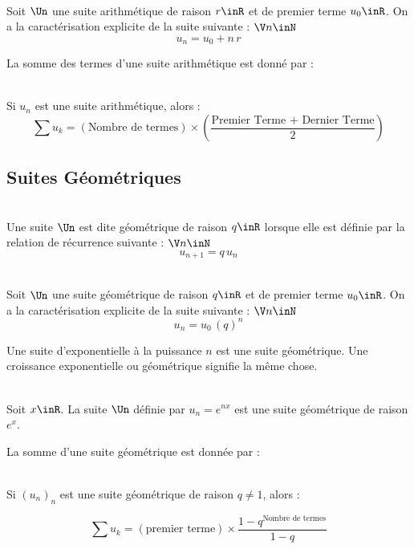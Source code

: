 \documentclass[12pt,fleqn]{report} %
\begin{document}
\begin{proposition}\text{ }\\
	Soit $\Un$ une suite arithmétique de raison $r \inR$ et de premier terme $u_0 \inR$. On a la caractérisation explicite de la suite suivante : $\V n \inN$
	\[
	u_n = u_0 + n\,r
	\]
\end{proposition}

La somme des termes d'une suite arithmétique est donné par :
\begin{proposition}\text{ }\\
	Si $u_n$ est une suite arithmétique, alors : 
	\[
	\sum u_k = (\text{Nombre de termes}) \times \left(\frac{\text{Premier Terme + Dernier Terme}}{2}\right) 
	\]
\end{proposition}



\subsection{Suites Géométriques}
\begin{definition}\text{ }\\
	Une suite $\Un$ est dite géométrique de raison $q \inR$ lorsque elle est définie par la relation de récurrence suivante : $\V n \inN$
	\[
	u_{n+1} = q \,u_n
	\]
\end{definition}

\begin{proposition}\text{ }\\
	Soit $\Un$ une suite géométrique de raison $q \inR$ et de premier terme $u_0 \inR$. On a la caractérisation explicite de la suite suivante : $\V n \inN$
	\[
	u_n = u_0 \, \left(q\right)^n
	\]
\end{proposition}
Une suite d'exponentielle à la puissance $n$ est une suite géométrique. Une croissance exponentielle ou géométrique signifie la même chose.
\begin{proposition}\text{ }\\
	Soit $x\inR$. La suite $\Un$ définie par $u_n = e^{nx}$ est une suite géométrique de raison $e^x$.
\end{proposition}
La somme d'une suite géométrique est donnée par : 

\begin{proposition}\text{ }\\
	Si $(u_n)_n$ est une suite géométrique de raison $q \neq1$, alors :
	
	\[
	\sum u_k = (\text{premier terme}) \times \frac{1 - q^{\text{Nombre de termes}}}{1 - q}
	\] 
\end{proposition}
\end{document}
